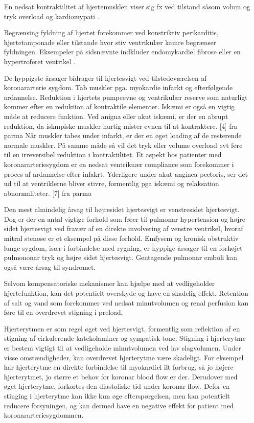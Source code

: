 En nedsat kontraktilitet af hjertemusklen viser sig fx ved tilstand såsom volum og tryk overload og kardiomypati \citep{Parmley1985}.

Begrænsing fyldning af hjertet forekommer ved konstriktiv perikarditis, hjertetamponade eller tilstande hvor stiv ventrikulær kamre begrænser fyldningen. Eksempeler på sidsnævnte indkluder endomykardiel fibrose eller en hypertroferet ventrikel \citep{Parmley1985}. 

De hyppigste årsager bidrager til hjertesvigt ved tilstedeværelsen af koronararterie sygdom. Tab muskler pga. myokardie infarkt og efterfølgende ardannelse. Reduktion i hjertets pumpeevne og ventrikulær reserve som naturligt kommer efter en reduktion af kontraktile elementer. Iskæmi er også en vigtig måde at reducere funktion. Ved anigna eller akut iskæmi, er der en abrupt reduktion, da iskmpiske muskler hurtig mister evnen til at kontraktere. [4] fra parma
Når muskler tabes under infarkt, er der en øget loading af de resterende normale muskler. På samme måde så vil det tryk eller volume overload evt føre til en irreversibel reduktion i kontraktilitet. Et aspekt hos patienter med koronararteriesygdom er en nedsat ventrikuær compliance som forekommer i proces af ardannelse efter infakrt. Yderligere under akut anginca pectoris, ser det ud til at ventriklerne bliver stivre, formentlig pga iskæmi og relaksation abnormaliteter. [7] fra parma

Den mest almindelig årsag til højresidet hjertesvigt er venstresidet hjertesvigt. Dog er der en antal vigtige forhold som fører til pulmonar hypertension og højre sidet hjertesvigt ved fravær af en direkte involvering af venstre ventrikel, hvoraf mitral stenose er et eksempel på disse forhold. Emfysem og kronisk obstruktiv lunge sygdom, især i forbindelse med rygning, er hyppige årsager til en forhøjet pulmononar tryk og højre sidet hjertesvigt. Gentagende pulmonar emboli kan også være årsag til syndromet. \citep{Parmley1985} 

Selvom kompensatoriske mekanismer kan hjælpe med at vedligeholder hjertefunktion, kan det potentielt overskyde og have en skadelig effekt. Retention af salt og vand  som forekommer ved nedsat minutvolumen og renal perfusion kan føre til en overdrevet stigning i preload. \citep{Parmley1985} 

Hjerterytmen er som regel øget ved hjertesvigt, formentlig som reflektion af en stigning af cirkulerende katekolaminer og sympatisk tone. Stigning i hjerterytme er bestem vigtigt til at vedligeholde minutvolumen ved lav slagvolumen. Under visse omstændigheder, kan overdrevet  hjerterytme være skadeligt. For eksempel har hjerterytme en direkte forbindelse til myokardiel ilt forbrug, så jo højere hjerterytmet, jo større et behov for koronar blood flow er der. Derudover med øget hjerterytme, forkortes den diastoliske tid under koronar flow. Defor en stinging i hjerterytme kan ikke kun øge efterspørgelsen, men kan potentielt reducere forsyningen, og kan dermed have en negative effekt for patient med koronararteriesygdommen. \citep{Parmley1985}

